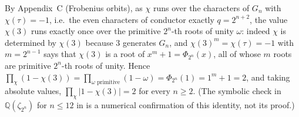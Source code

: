 By Appendix~C (Frobenius orbits), as $\chi$ runs over the characters of $G_n$ with $\chi(\tau)=-1$, i.e.\ the even characters of conductor exactly $q=2^{n+2}$, the value $\chi(3)$ runs exactly once over the primitive $2^n$-th roots of unity $\omega$: indeed $\chi$ is determined by $\chi(3)$ because $3$ generates $G_n$, and $\chi(3)^m=\chi(\tau)=-1$ with $m=2^{n-1}$ says that $\chi(3)$ is a root of $x^m+1=\Phi_{2^n}(x)$, all of whose $m$ roots are primitive $2^n$-th roots of unity. Hence $\prod_\chi(1-\chi(3))=\prod_{\omega\text{ primitive}}(1-\omega)=\Phi_{2^n}(1)=1^{m}+1=2$, and taking absolute values, $\prod_\chi|1-\chi(3)|=2$ for every $n\ge2$. (The symbolic check in $\mathbb Q(\zeta_{2^n})$ for $n\le12$ in  is a numerical confirmation of this identity, not its proof.)
